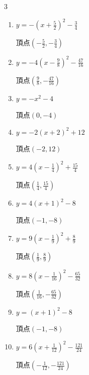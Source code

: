 \begin{multicols}{3}
\begin{enumerate}
        $\displaystyle 頂点\left( \frac{1}{2} , 7 \right)$

  \item $\displaystyle y=-\left( x+\frac{5}{2}\right)^{2}-\frac{3}{4}$

        $\displaystyle 頂点\left( -\frac{5}{2} , -\frac{3}{4} \right)$

  \item $\displaystyle y=-4\left( x-\frac{9}{8}\right)^{2}-\frac{47}{16}$

        $\displaystyle 頂点\left( \frac{9}{8} , -\frac{47}{16} \right)$

  \item $\displaystyle y=-x^{2}-4$

        $\displaystyle 頂点\left( 0 , -4 \right)$

  \item $\displaystyle y=-2\left( x+2\right)^{2}+12$

        $\displaystyle 頂点\left( -2 , 12 \right)$

  \item $\displaystyle y=4\left( x-\frac{1}{4}\right)^{2}+\frac{15}{4}$

        $\displaystyle 頂点\left( \frac{1}{4} , \frac{15}{4} \right)$

  \item $\displaystyle y=4\left( x+1\right)^{2}-8$

        $\displaystyle 頂点\left( -1 , -8 \right)$

  \item $\displaystyle y=9\left( x-\frac{1}{9}\right)^{2}+\frac{8}{9}$

        $\displaystyle 頂点\left( \frac{1}{9} , \frac{8}{9} \right)$

  \item $\displaystyle y=8\left( x-\frac{1}{16}\right)^{2}-\frac{65}{32}$

        $\displaystyle 頂点\left( \frac{1}{16} , -\frac{65}{32} \right)$

  \item $\displaystyle y=\left( x+1\right)^{2}-8$

        $\displaystyle 頂点\left( -1 , -8 \right)$

\columnbreak %

  \item $\displaystyle y=6\left( x+\frac{1}{12}\right)^{2}-\frac{121}{24}$

        $\displaystyle 頂点\left( -\frac{1}{12} , -\frac{121}{24} \right)$


\end{enumerate}
\end{multicols}
